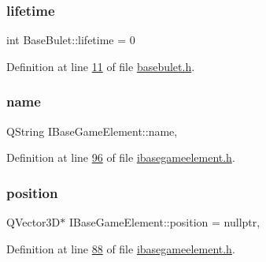 \mbox{\label{a00153_a9ad5db3e6e5d664e1ca4390285d43782}} 
\subsubsection{\texorpdfstring{lifetime}{lifetime}}
{\footnotesize\ttfamily int Base\+Bulet\+::lifetime = 0\hspace{0.3cm}{\ttfamily [protected]}}



Definition at line \hyperlink{a00035_source_l00011}{11} of file \hyperlink{a00035_source}{basebulet.\+h}.

\mbox{\label{a00137_af35fba4ed599605c3d78b3c3a71fa467}} 
\subsubsection{\texorpdfstring{name}{name}}
{\footnotesize\ttfamily Q\+String I\+Base\+Game\+Element\+::name\hspace{0.3cm}{\ttfamily [protected]}, {\ttfamily [inherited]}}



Definition at line \hyperlink{a00047_source_l00096}{96} of file \hyperlink{a00047_source}{ibasegameelement.\+h}.

\mbox{\label{a00137_afe080b1942ec40832e94cb884ec87456}} 
\subsubsection{\texorpdfstring{position}{position}}
{\footnotesize\ttfamily Q\+Vector3D$\ast$ I\+Base\+Game\+Element\+::position = nullptr\hspace{0.3cm}{\ttfamily [protected]}, {\ttfamily [inherited]}}



Definition at line \hyperlink{a00047_source_l00088}{88} of file \hyperlink{a00047_source}{ibasegameelement.\+h}.

\mbox{\label{a00137_ae0ad3c240950eba352aeb04e6a9296b4}} 
